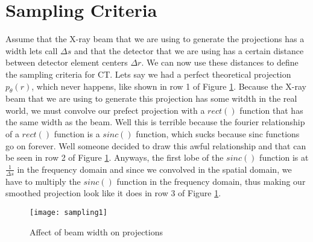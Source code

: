 \section{Sampling Criteria}
Assume that the X-ray beam that we are using to generate the projections has a width lets call $\Delta s$ and that the detector that we are using has a certain distance between detector element centers $\Delta r$.  We can now use these distances to define the sampling criteria for CT. Lets say we had a perfect theoretical projection $p_{\theta}(r)$, which never happens, like shown in row 1 of Figure \ref{fig:ct:samp1}. Because the X-ray beam that we are using to generate this projection has some witdth in the real world, we must convolve our prefect projection with a $rect()$ function that has the same width as the beam. Well this is terrible because the fourier relationship of a $rect()$ function is a $sinc()$ function, which sucks because sinc functions go on forever. Well someone decided to draw this awful relationship and that can be seen in row 2 of Figure \ref{fig:ct:samp1}. Anyways, the first lobe of the $sinc()$ function is at $\frac{1}{\Delta s}$ in the frequency domain and since we convolved in the spatial domain, we have to multiply the $sinc()$ function in the frequency domain, thus making our smoothed projection look like it does in row 3 of Figure \ref{fig:ct:samp1}.

\begin{figure}[ht]
	\centering
	\texttt{[image: sampling1]}
	\caption{Affect of beam width on projections}
	\label{fig:ct:samp1}
\end{figure}

